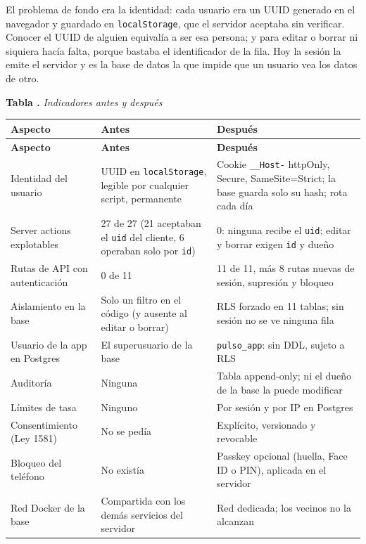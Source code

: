 \documentclass[11pt,letterpaper]{article}
\newcommand{\cod}[1]{\texttt{#1}}
\newcounter{tablaapa}
\newcommand{\tablaAPA}[2]{\refstepcounter{tablaapa}\label{#1}%
  \noindent\textbf{Tabla \thetablaapa.} \textit{#2}\par\vspace{0.15cm}}
\begin{document}
El problema de fondo era la identidad: cada usuario era un UUID generado en el
navegador y guardado en \cod{localStorage}, que el servidor aceptaba sin
verificar. Conocer el UUID de alguien equivalía a ser esa persona; y para editar
o borrar ni siquiera hacía falta, porque bastaba el identificador de la fila. Hoy
la sesión la emite el servidor y es la base de datos la que impide que un usuario
vea los datos de otro.

\vspace{4pt}
\tablaAPA{tab:resumen}{Indicadores antes y después}
\vspace{-0.35cm}
{\renewcommand{\arraystretch}{1.2}\small
\begin{longtable}{@{}P{4.0cm}P{5.6cm}P{6.3cm}@{}}
\toprule
\textbf{Aspecto} & \textbf{\color{antes}Antes} & \textbf{\color{despues}Después} \\
\midrule
\endfirsthead
\toprule
\textbf{Aspecto} & \textbf{\color{antes}Antes} & \textbf{\color{despues}Después} \\
\midrule
\endhead
Identidad del usuario & UUID en \cod{localStorage}, legible por cualquier script, permanente & Cookie \cod{\_\_Host-} httpOnly, Secure, SameSite=Strict; la base guarda solo su hash; rota cada día \\
Server actions explotables & 27 de 27 (21 aceptaban el \cod{uid} del cliente, 6 operaban solo por \cod{id}) & 0: ninguna recibe el \cod{uid}; editar y borrar exigen \cod{id} y dueño \\
Rutas de API con autenticación & 0 de 11 & 11 de 11, más 8 rutas nuevas de sesión, supresión y bloqueo \\
Aislamiento en la base & Solo un filtro en el código (y ausente al editar o borrar) & RLS forzado en 11 tablas; sin sesión no se ve ninguna fila \\
Usuario de la app en Postgres & El superusuario de la base & \cod{pulso\_app}: sin DDL, sujeto a RLS \\
Auditoría & Ninguna & Tabla append-only; ni el dueño de la base la puede modificar \\
Límites de tasa & Ninguno & Por sesión y por IP en Postgres \\
Consentimiento (Ley 1581) & No se pedía & Explícito, versionado y revocable \\
Bloqueo del teléfono & No existía & Passkey opcional (huella, Face ID o PIN), aplicada en el servidor \\
Red Docker de la base & Compartida con los demás servicios del servidor & Red dedicada; los vecinos no la alcanzan \\

\end{longtable}}
\end{document}
